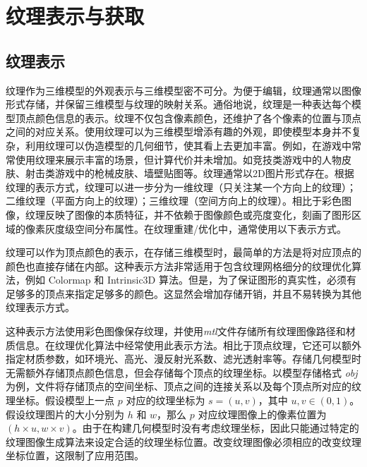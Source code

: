 %
%
\section{纹理表示与获取}
\subsection{纹理表示}
纹理作为三维模型的外观表示与三维模型密不可分。为便于编辑，纹理通常以图像形式存储，并保留三维模型与纹理的映射关系。通俗地说，纹理是一种表达每个模型顶点颜色信息的表示。纹理不仅包含像素颜色，还维护了各个像素的位置与顶点之间的对应关系。使用纹理可以为三维模型增添有趣的外观，即使模型本身并不复杂，利用纹理可以伪造模型的几何细节，使其看上去更加丰富。例如，在游戏中常常使用纹理来展示丰富的场景，但计算代价并未增加。如竞技类游戏中的人物皮肤、射击类游戏中的枪械皮肤、墙壁贴图等。纹理通常以2D图片形式存在。根据纹理的表示方式，纹理可以进一步分为一维纹理（只关注某一个方向上的纹理）；二维纹理（平面方向上的纹理）；三维纹理（空间方向上的纹理）。相比于彩色图像，纹理反映了图像的本质特征，并不依赖于图像颜色或亮度变化，刻画了图形区域的像素灰度级空间分布属性。在纹理重建/优化中，通常使用以下表示方式。\par
\vspace*{2mm} 纹理可以作为顶点颜色的表示，在存储三维模型时，最简单的方法是将对应顶点的颜色也直接存储在内部。这种表示方法非常适用于包含纹理网格细分的纹理优化算法，例如 Colormap 和 Intrinsic3D 算法。但是，为了保证图形的真实性，必须有足够多的顶点来指定足够多的颜色。这显然会增加存储开销，并且不易转换为其他纹理表示方式。\par
\vspace*{2mm}这种表示方法使用彩色图像保存纹理，并使用\emph{mtl}文件存储所有纹理图像路径和材质信息。在纹理优化算法中经常使用此表示方法。相比于顶点纹理，它还可以额外指定材质参数，如环境光、高光、漫反射光系数、滤光透射率等。存储几何模型时无需额外存储顶点颜色信息，但会存储每个顶点的纹理坐标。以模型存储格式 \emph{obj} 为例，文件将存储顶点的空间坐标、顶点之间的连接关系以及每个顶点所对应的纹理坐标。假设模型上一点 $p$ 对应的纹理坐标为 $s = (u,v)$，其中 $u,v \in (0,1)$。假设纹理图片的大小分别为 $h$ 和 $w$，那么 $p$ 对应纹理图像上的像素位置为 $(h \times u, w \times v)$。由于在构建几何模型时没有考虑纹理坐标，因此只能通过特定的纹理图像生成算法来设定合适的纹理坐标位置。改变纹理图像必须相应的改变纹理坐标位置，这限制了应用范围。\par

